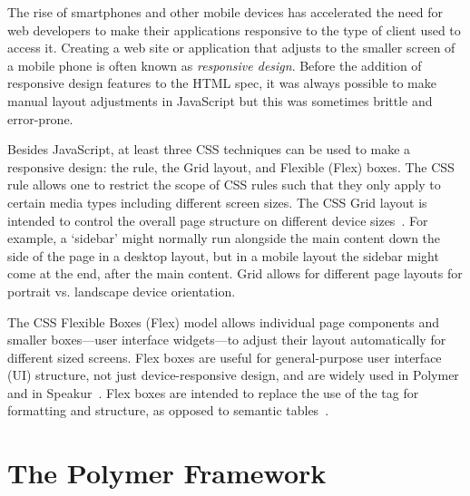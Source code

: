 The rise of smartphones and other mobile devices has accelerated the need for web developers to make their applications responsive to the type of client used to access it.
Creating a web site or application that adjusts to the smaller screen of a mobile phone is often known as \textit{responsive design}.
Before the addition of responsive design features to the HTML spec, 
it was always possible to make manual layout adjustments in JavaScript but this was sometimes brittle and error-prone.

Besides JavaScript, at least three CSS techniques can be used to make a responsive design: 
the  rule, 
the Grid layout, 
and Flexible (Flex) boxes.
The CSS  rule allows one to restrict the scope of CSS rules such that they only apply to certain media types including different screen sizes.
The CSS Grid layout is intended to control the overall page structure on different device sizes~\cite{w3ccontributors2015-d}.
For example, a `sidebar' might normally run alongside the main content down the side of the page in a desktop layout, but in a mobile layout the sidebar might come at the end, after the main content.
Grid allows for different page layouts for portrait vs. landscape device orientation.

The CSS Flexible Boxes (Flex) model allows individual page components and smaller boxes---user interface widgets---to adjust their layout automatically for different sized screens.
Flex boxes are useful for general-purpose user interface (UI) structure, not just device-responsive design, and are widely used in Polymer and in Speakur~\cite{polymercontributors2015-d}.
Flex boxes are intended to replace the use of the  tag for formatting and structure, as opposed to semantic tables~\cite{mozillacontributors2015}.

\section{The Polymer Framework}

